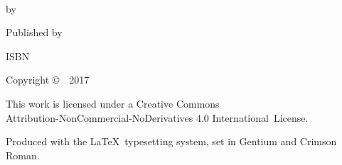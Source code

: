 \cleartoverso
\thispagestyle{empty}

{\copyrightsize
\centering
\setlength{\parindent}{0pt}%
\setlength{\parskip}{0.8\baselineskip}%

\thetitle\\
by \theauthor

Published by \thePublisher

ISBN \theISBN

Copyright \copyright\ \thePublisher\ 2017


\vfill

{\footnotesize

This work is licensed under a Creative Commons\\
Attribution-NonCommercial-NoDerivatives 4.0 International~License.

Produced with the \LaTeX\ typesetting system, set in Gentium and Crimson Roman.

\theEditionInfo

}}
